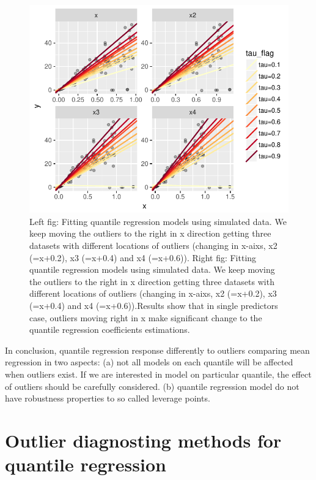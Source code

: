 \documentclass[11pt,a4paper,]{article}
\theoremstyle{definition}
\theoremstyle{definition}
\theoremstyle{remark}
\begin{document}
\begin{figure}

{\centering \includegraphics{Diagnosing_outliers_and_visualization_of_quantile_regression_models_files/figure-latex/move-x1-1} 

}

\caption{Left fig: Fitting quantile regression models using simulated data. We keep moving the outliers to the right in x direction getting three datasets with different locations of outliers (changing in x-aixs, x2 (=x+0.2), x3 (=x+0.4) and x4 (=x+0.6)). Right fig: Fitting quantile regression models using simulated data. We keep moving the outliers to the right in x direction getting three datasets with different locations of outliers (changing in x-aixs, x2 (=x+0.2), x3 (=x+0.4) and x4 (=x+0.6)).Results show that in single predictors case, outliers moving right in x make significant change to the quantile regression coefficients estimations.}\label{fig:move-x1}
\end{figure}

In conclusion, quantile regression response differently to outliers
comparing mean regression in two aspects: (a) not all models on each
quantile will be affected when outliers exist. If we are interested in
model on particular quantile, the effect of outliers should be carefully
considered. (b) quantile regression model do not have robustness
properties to so called leverage points.

\section{Outlier diagnosting methods for quantile
regression}\label{outlier-diagnosting-methods-for-quantile-regression}
\end{document}

